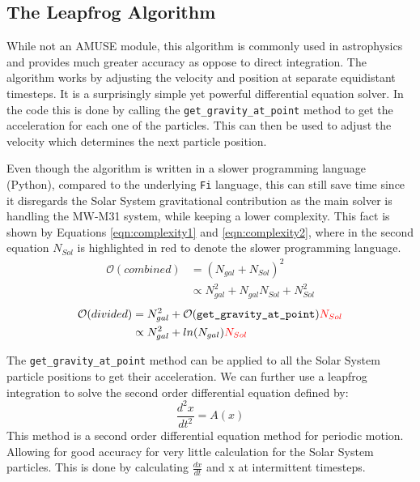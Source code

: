 \documentclass[a4paper,12pt, english]{article}
\begin{document}
\subsection{The Leapfrog Algorithm}
\label{leapfrog}
While not an AMUSE module, this algorithm is commonly used in astrophysics and provides much greater accuracy as oppose to direct integration. The algorithm works by adjusting the velocity and position at separate equidistant timesteps. It is a surprisingly simple yet powerful differential equation solver. In the code this is done by calling the \texttt{get\_gravity\_at\_point} method to get the acceleration for each one of the particles. This can then be used to adjust the velocity which determines the next particle position.\par
\smallskip
Even though the algorithm is written in a slower programming language (Python), compared to the underlying \texttt{Fi} language, this can still save time since it disregards the Solar System gravitational contribution as the main solver is handling the MW-M31 system, while keeping a lower complexity. This fact is shown by Equations \ref{eqn:complexity1} and \ref{eqn:complexity2}, where in the second equation $N_{Sol}$ is highlighted in red to denote the slower programming language.
\begin{align}
    \mathcal{O}(combined) &= (N_{gal}+N_{Sol})^2 \nonumber \\ 
    &\propto N_{gal}^2 + N_{gal}N_{Sol} + N_{Sol}^2 \label{eqn:complexity1}
\end{align}
\begin{align}
    \mathcal{O}(divided) &= N_{gal}^2 +  \mathcal{O}(\texttt{get\_gravity\_at\_point})\textcolor{red}{N_{Sol}} \nonumber \\
    &\propto N_{gal}^2 + ln(N_{gal})\textcolor{red}{N_{Sol}} \label{eqn:complexity2}
\end{align}\par
\smallskip
The \texttt{get\_gravity\_at\_point} method can be applied to all the Solar System particle positions to get their acceleration. We can further use a leapfrog integration to solve the second order differential equation defined by:
\begin{equation}
    \frac{d^2x}{dt^2} = A(x)
\end{equation}
This method is a second order differential equation method for periodic motion. Allowing for good accuracy for very little calculation for the Solar System particles. This is done by calculating $\frac{dx}{dt}$ and x at intermittent timesteps.\par
\end{document}
